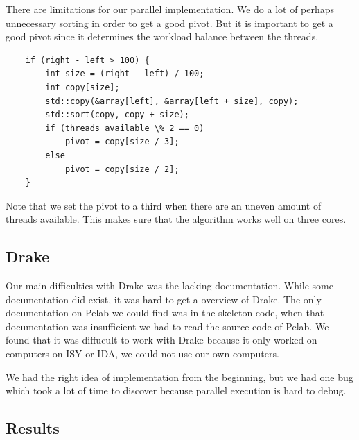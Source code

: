 \documentclass[a4paper,12pt]{article}
\begin{document}
\begin{minipage}{\textwidth}
	There are limitations for our parallel implementation. We do a lot of perhaps unnecessary sorting in order to get a good pivot. But it is important to get a good pivot since it determines the workload balance between the threads.

  \begin{lstlisting}
	if (right - left > 100) {
		int size = (right - left) / 100;
		int copy[size];
		std::copy(&array[left], &array[left + size], copy);
		std::sort(copy, copy + size);
		if (threads_available \% 2 == 0)
			pivot = copy[size / 3];
		else
			pivot = copy[size / 2];
	}
  \end{lstlisting}

  Note that we set the pivot to a third when there are an uneven amount of threads available. This makes sure that the algorithm works well on three cores.
\end{minipage}
\subsection{Drake}

	Our main difficulties with Drake was the lacking documentation. While some documentation did exist, it was hard to get a overview of Drake. The only documentation on Pelab we could find was in the skeleton code, when that documentation was insufficient we had to read the source code of Pelab. We found that it was diffucult to work with Drake because it only worked on computers on ISY or IDA, we could not use our own computers.

	We had the right idea of implementation from the beginning, but we had one bug which took a lot of time to discover because parallel execution is hard to debug. 

\subsection{Results}
\end{document}
